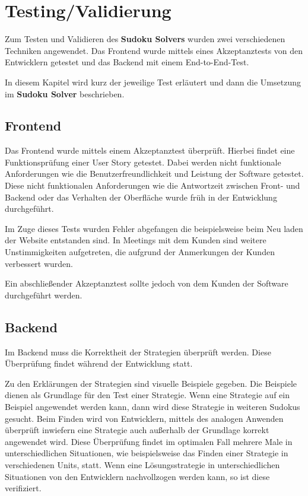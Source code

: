 
\chapter{Testing/Validierung}
Zum Testen und Validieren des \textbf{Sudoku Solvers} wurden zwei verschiedenen Techniken angewendet. Das Frontend wurde mittels eines Akzeptanztests von den Entwicklern getestet und das Backend mit einem End-to-End-Test.

In diesem Kapitel wird kurz der jeweilige Test erläutert und dann die Umsetzung im \textbf{Sudoku Solver} beschrieben.

\section{Frontend}

Das Frontend wurde mittels einem Akzeptanztest überprüft. Hierbei findet eine Funktionsprüfung einer User Story getestet. Dabei werden nicht funktionale Anforderungen wie die Benutzerfreundlichkeit und Leistung der Software getestet. Diese nicht funktionalen Anforderungen wie die Antwortzeit zwischen Front- und Backend oder das Verhalten der Oberfläche wurde früh in der Entwicklung durchgeführt.

Im Zuge dieses Tests wurden Fehler abgefangen die beispielsweise beim Neu laden der Website entstanden sind. In Meetings mit dem Kunden sind weitere Unstimmigkeiten aufgetreten, die aufgrund der Anmerkungen der Kunden verbessert wurden.

Ein abschließender Akzeptanztest sollte jedoch von dem Kunden der Software durchgeführt werden.

\section{Backend}

Im Backend muss die Korrektheit der Strategien überprüft werden. Diese Überprüfung findet während der Entwicklung statt. 

Zu den Erklärungen der Strategien sind visuelle Beispiele gegeben. Die Beispiele dienen als Grundlage für den Test einer Strategie. Wenn eine Strategie auf ein Beispiel angewendet werden kann, dann wird diese Strategie in weiteren Sudokus gesucht. Beim Finden wird von Entwicklern, mittels des analogen Anwenden überprüft inwiefern eine Strategie auch außerhalb der Grundlage korrekt angewendet wird. Diese Überprüfung findet im optimalen Fall mehrere Male in unterschiedlichen Situationen, wie beispielsweise das Finden einer Strategie in verschiedenen Units, statt. Wenn eine Lösungsstrategie in unterschiedlichen Situationen von den Entwicklern nachvollzogen werden kann, so ist diese verifiziert.

